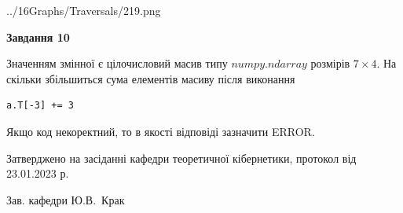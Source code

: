 \documentclass[12pt, ukrainian]{article}
\begin{document}
{\begin {large}
\begin{center}
	{../16Graphs/Traversals/219.png}
\end{center}\par
\newpage

{\begin {center}\textbf{Завдання 10}\end {center}}\par
Значенням змінної  є цілочисловий масив типу $numpy.ndarray$ розмірів $7{\times}4$. На скільки збільшиться сума елементів масиву  після виконання
\begin{verbatim}
a.T[-3] += 3
\end{verbatim}


Якщо код некоректний, то в якості відповіді зазначити ERROR.\par
\newpage


\end {large}
}
{\smallskip \begin {small} Затверджено на засіданні кафедри теоретичної кібернетики, протокол  від   23.01.2023 р.\par\smallskip\smallskip
{\parbox {6.5 cm}{Зав. кафедри \dotfill Ю.В.~Крак}} \end{small}}
\end{document}

